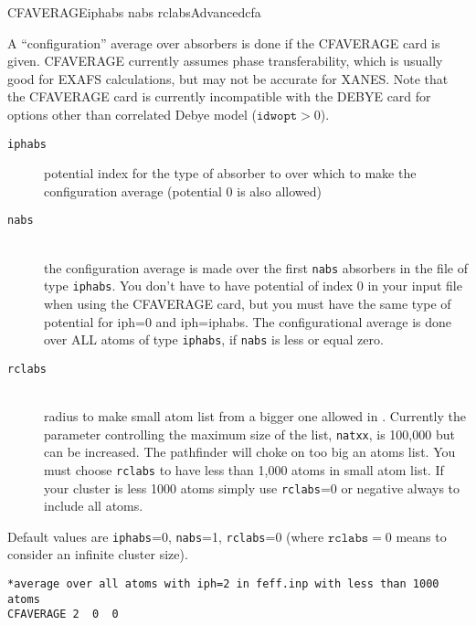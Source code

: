 \documentclass[11pt,oneside]{report} %
\begin{document}
\begin{Card}{CFAVERAGE}{iphabs nabs rclabs}{Advanced}{cfa}

  A ``configuration'' average over absorbers is done if the CFAVERAGE
  card is given.  CFAVERAGE currently assumes phase transferability,
  which is usually good for EXAFS calculations, but may not be accurate for
  XANES.  Note that the CFAVERAGE card is currently incompatible with
  the DEBYE card for options other than
  correlated Debye model ($\texttt{idwopt} > 0$).
  \begin{description}
  \item[\texttt{iphabs}] potential index for the type of absorber to
    over which to make the configuration average (potential 0 is also
    allowed)
  \item[\texttt{nabs}]\hfill\\ the configuration average is made over
    the first \texttt{nabs} absorbers in the  file of
    type \texttt{iphabs}.  You don't have to have potential of index 0
    in your input file when using the CFAVERAGE card, but you must
    have the same type of potential for iph=0 and iph=iphabs.  The
    configurational average is done over ALL atoms of type
    \texttt{iphabs}, if \texttt{nabs} is less or equal zero.
  \item[\texttt{rclabs}]\hfill\\ radius to make small atom list from a
    bigger one allowed in .  Currently the parameter
    controlling the maximum size of the list, \texttt{natxx}, is
    100,000 but can be increased.  The pathfinder will choke on too
    big an atoms list.  You must choose \texttt{rclabs} to have less
    than 1,000 atoms in small atom list.  If your cluster is less 1000
    atoms simply use \texttt{rclabs}=0 or negative always to include
    all atoms.
  \end{description}
  Default values are \texttt{iphabs}=0, \texttt{nabs}=1,
  \texttt{rclabs}=0 (where $\mathtt{rclabs}=0$ means to consider an
  infinite cluster size).
\begin{verbatim}
*average over all atoms with iph=2 in feff.inp with less than 1000 atoms
CFAVERAGE 2  0  0
\end{verbatim}
\end{Card}
\end{document}
